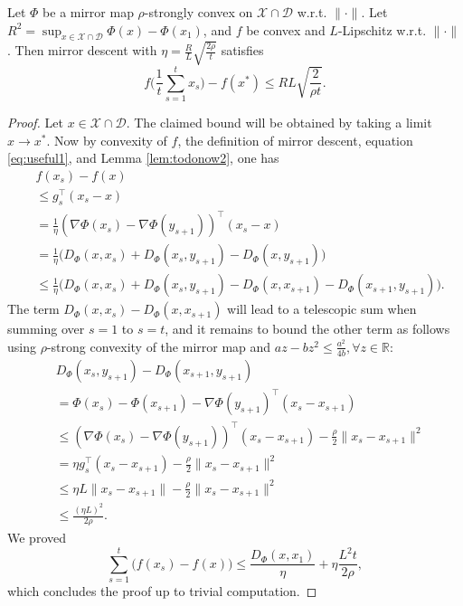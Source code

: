 \documentclass[openany]{now}
\newcommand{\R}{\mathbb{R}}
\begin{document}
\begin{theorem} \label{th:MD}
Let $\Phi$ be a mirror map $\rho$-strongly convex on $\mathcal{X} \cap \mathcal{D}$ w.r.t. $\|\cdot\|$.
Let $R^2 = \sup_{x \in \mathcal{X} \cap \mathcal{D}} \Phi(x) - \Phi(x_1)$, and $f$ be convex and $L$-Lipschitz w.r.t. $\|\cdot\|$. Then mirror descent with $\eta = \frac{R}{L} \sqrt{\frac{2 \rho}{t}}$ satisfies
$$f\bigg(\frac{1}{t} \sum_{s=1}^t x_s \bigg) - f(x^*) \leq RL \sqrt{\frac{2}{\rho t}} .$$
\end{theorem}

\begin{proof}
Let $x \in \mathcal{X} \cap \mathcal{D}$. The claimed bound will be obtained by taking a limit $x \rightarrow x^*$. Now by convexity of $f$, the definition of mirror descent, equation \eqref{eq:useful1}, and Lemma \ref{lem:todonow2}, one has
\begin{align*}
& f(x_s) - f(x) \\
& \leq g_s^{\top} (x_s - x) \\
& = \frac{1}{\eta} (\nabla \Phi(x_s) - \nabla \Phi(y_{s+1}))^{\top} (x_s - x) \\
& = \frac{1}{\eta} \bigg( D_{\Phi}(x, x_s) + D_{\Phi}(x_s, y_{s+1}) - D_{\Phi}(x, y_{s+1}) \bigg) \\
& \leq \frac{1}{\eta} \bigg( D_{\Phi}(x, x_s) + D_{\Phi}(x_s, y_{s+1}) - D_{\Phi}(x, x_{s+1}) - D_{\Phi}(x_{s+1}, y_{s+1}) \bigg) .
\end{align*}
The term $D_{\Phi}(x, x_s) -  D_{\Phi}(x, x_{s+1})$ will lead to a telescopic sum when summing over $s=1$ to $s=t$, and it remains to bound the other term as follows using $\rho$-strong convexity of the mirror map and $a z - b z^2 \leq \frac{a^2}{4 b}, \forall z \in \R$:
\begin{align*}
& D_{\Phi}(x_s, y_{s+1}) - D_{\Phi}(x_{s+1}, y_{s+1}) \\
& = \Phi(x_s) - \Phi(x_{s+1}) - \nabla \Phi(y_{s+1})^{\top} (x_{s} - x_{s+1}) \\
& \leq (\nabla \Phi(x_s) - \nabla \Phi(y_{s+1}))^{\top} (x_{s} - x_{s+1}) - \frac{\rho}{2} \|x_s - x_{s+1}\|^2 \\
& = \eta g_s^{\top} (x_{s} - x_{s+1}) - \frac{\rho}{2} \|x_s - x_{s+1}\|^2 \\
& \leq \eta L \|x_{s} - x_{s+1}\| - \frac{\rho}{2} \|x_s - x_{s+1}\|^2 \\
& \leq \frac{(\eta L)^2}{2 \rho}.
\end{align*}
We proved 
$$\sum_{s=1}^t \bigg(f(x_s) - f(x)\bigg) \leq \frac{D_{\Phi}(x,x_1)}{\eta} + \eta \frac{L^2 t}{2 \rho},$$
which concludes the proof up to trivial computation.
\end{proof}
\end{document}

